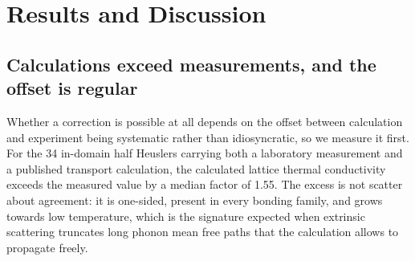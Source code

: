 %
%
%

\section{Results and Discussion}
\label{sec:results}

\subsection{Calculations exceed measurements, and the offset is regular}
\label{sec:offset}

Whether a correction is possible at all depends on the offset between calculation and experiment
being systematic rather than idiosyncratic, so we measure it first. For the \num{34} in-domain half
Heuslers carrying both a laboratory measurement and a published transport calculation, the
calculated lattice thermal conductivity exceeds the measured value by a median factor of
\num{1.55}. The excess is not scatter about agreement: it is one-sided, present in every bonding
family, and grows towards low temperature, which is the signature expected when extrinsic
scattering truncates long phonon mean free paths that the calculation allows to propagate freely.

